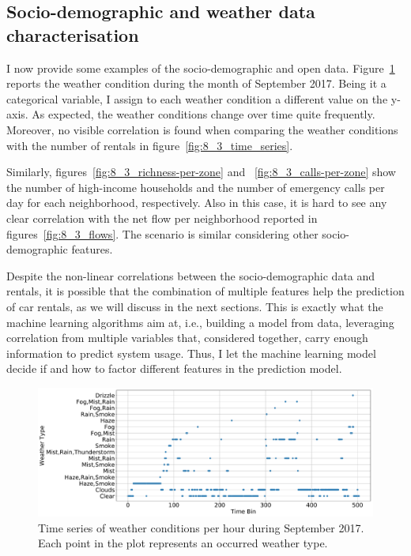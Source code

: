 \subsection{Socio-demographic and weather data characterisation}

I now provide some examples of the socio-demographic and open data. Figure~\ref{fig:8_3_weather-per-day} reports the weather condition during the month of September 2017. Being it a categorical variable, I assign to each weather condition a different value on the y-axis. As expected, the weather conditions change over time quite frequently. Moreover, no visible correlation is found when comparing the weather conditions with the number of rentals in figure~\ref{fig:8_3_time_series}. 

Similarly, figures~\ref{fig:8_3_richness-per-zone} and ~\ref{fig:8_3_calls-per-zone} show the number of high-income households and the number of emergency calls per day for each neighborhood, respectively. Also in this case, it is hard to see any clear correlation with the net flow per neighborhood reported in figures~\ref{fig:8_3_flows}. The scenario is similar considering other socio-demographic features.

Despite the non-linear correlations between the socio-demographic data and rentals, it is possible that the combination of multiple features help the prediction of car rentals, as we will discuss in the next sections. 
This is exactly what the machine learning algorithms aim at, i.e., building a model from data, leveraging correlation from multiple variables that, considered together, carry enough information to predict system usage.
Thus, I let the machine learning model decide if and how to factor different features in the prediction model.

\begin{figure}
    \centering
    \includegraphics[width=0.8\columnwidth]{figures/temporal_characterization/WeatherPeriod2.pdf}
     \caption{Time series of weather conditions per hour during September 2017. Each point in the plot represents an occurred weather type.}
     \label{fig:8_3_weather-per-day}
\end{figure}



